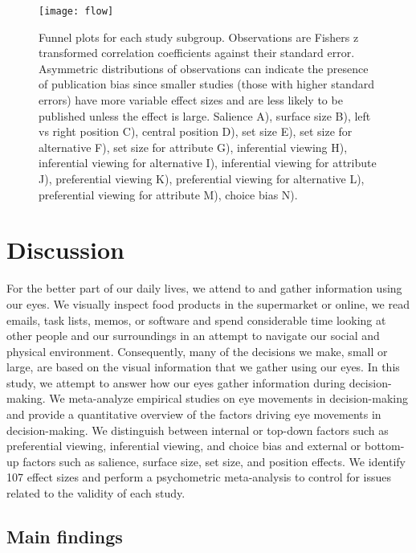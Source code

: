 \documentclass{article}
\begin{document}
\begin{figure}[H]
\texttt{[image: flow]}
\centering
\caption{Funnel plots for each study subgroup. Observations are Fishers z transformed correlation coefficients against their standard error. Asymmetric distributions of observations can indicate the presence of publication bias since smaller studies (those with higher standard errors) have more variable effect sizes and are less likely to be published unless the effect is large. Salience A), surface size B), left vs right position C), central position D), set size E), set size for alternative F), set size for attribute G), inferential viewing H), inferential viewing for alternative I), inferential viewing for attribute J), preferential viewing K), preferential viewing for alternative L), preferential viewing for attribute M), choice bias N).}
\label{fig:funnel_plots}
\end{figure}



\section{Discussion}

For the better part of our daily lives, we attend to and gather information using our eyes. We visually inspect food products in the supermarket or online, we read emails, task lists, memos, or software and spend considerable time looking at other people and our surroundings in an attempt to navigate our social and physical environment. Consequently, many of the decisions we make, small or large, are based on the visual information that we gather using our eyes. In this study, we attempt to answer how our eyes gather information during decision-making. We meta-analyze empirical studies on eye movements in decision-making and provide a quantitative overview of the factors driving eye movements in decision-making. We distinguish between internal or top-down factors such as preferential viewing, inferential viewing, and choice bias and external or bottom-up factors such as salience, surface size, set size, and position effects. We identify 107 effect sizes and perform a psychometric meta-analysis to control for issues related to the validity of each study. 


\subsection{Main findings}
\end{document}
